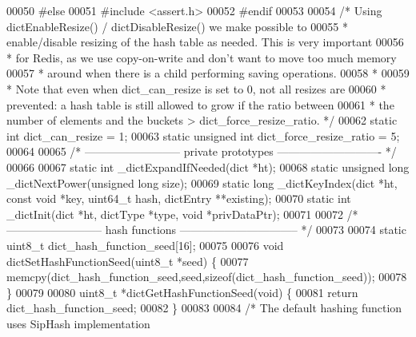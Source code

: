 \begin{DoxyCode}
00050 \textcolor{preprocessor}{#}\textcolor{preprocessor}{else}
00051 \textcolor{preprocessor}{#}\textcolor{preprocessor}{include} \textcolor{preprocessor}{<}\textcolor{preprocessor}{assert}\textcolor{preprocessor}{.}\textcolor{preprocessor}{h}\textcolor{preprocessor}{>}
00052 \textcolor{preprocessor}{#}\textcolor{preprocessor}{endif}
00053 
00054 \textcolor{comment}{/* Using dictEnableResize() / dictDisableResize() we make possible to}
00055 \textcolor{comment}{ * enable/disable resizing of the hash table as needed. This is very important}
00056 \textcolor{comment}{ * for Redis, as we use copy-on-write and don't want to move too much memory}
00057 \textcolor{comment}{ * around when there is a child performing saving operations.}
00058 \textcolor{comment}{ *}
00059 \textcolor{comment}{ * Note that even when dict\_can\_resize is set to 0, not all resizes are}
00060 \textcolor{comment}{ * prevented: a hash table is still allowed to grow if the ratio between}
00061 \textcolor{comment}{ * the number of elements and the buckets > dict\_force\_resize\_ratio. */}
00062 \textcolor{keyword}{static} \textcolor{keywordtype}{int} dict\_can\_resize = 1;
00063 \textcolor{keyword}{static} \textcolor{keywordtype}{unsigned} \textcolor{keywordtype}{int} dict\_force\_resize\_ratio = 5;
00064 
00065 \textcolor{comment}{/* -------------------------- private prototypes ---------------------------- */}
00066 
00067 \textcolor{keyword}{static} \textcolor{keywordtype}{int} \_dictExpandIfNeeded(dict *ht);
00068 \textcolor{keyword}{static} \textcolor{keywordtype}{unsigned} \textcolor{keywordtype}{long} \_dictNextPower(\textcolor{keywordtype}{unsigned} \textcolor{keywordtype}{long} size);
00069 \textcolor{keyword}{static} \textcolor{keywordtype}{long} \_dictKeyIndex(dict *ht, \textcolor{keyword}{const} \textcolor{keywordtype}{void} *key, uint64\_t hash, dictEntry **existing);
00070 \textcolor{keyword}{static} \textcolor{keywordtype}{int} \_dictInit(dict *ht, dictType *type, \textcolor{keywordtype}{void} *privDataPtr);
00071 
00072 \textcolor{comment}{/* -------------------------- hash functions -------------------------------- */}
00073 
00074 \textcolor{keyword}{static} uint8\_t dict\_hash\_function\_seed[16];
00075 
00076 \textcolor{keywordtype}{void} dictSetHashFunctionSeed(uint8\_t *seed) \{
00077     memcpy(dict\_hash\_function\_seed,seed,\textcolor{keyword}{sizeof}(dict\_hash\_function\_seed));
00078 \}
00079 
00080 uint8\_t *dictGetHashFunctionSeed(\textcolor{keywordtype}{void}) \{
00081     \textcolor{keywordflow}{return} dict\_hash\_function\_seed;
00082 \}
00083 
00084 \textcolor{comment}{/* The default hashing function uses SipHash implementation}

\end{DoxyCode}
